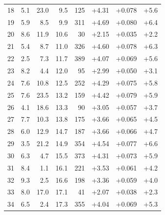 \begin{longtable}{@{}r r r r r r r r@{}}
18 & 5.1 & 23.0 & 9.5 & 125 & \cellcolor{green!55}+4.31 & \cellcolor{yellow!57}+0.078 & \cellcolor{orange!50}+5.6 \\
19 & 5.9 & 8.5 & 9.9 & 311 & \cellcolor{green!59}+4.69 & \cellcolor{yellow!58}+0.080 & \cellcolor{orange!55}+6.4 \\
20 & 8.6 & 11.9 & 10.6 & 30 & \cellcolor{green!33}+2.15 & \cellcolor{yellow!31}+0.035 & \cellcolor{orange!27}+2.2 \\
21 & 5.4 & 8.7 & 11.0 & 326 & \cellcolor{green!58}+4.60 & \cellcolor{yellow!57}+0.078 & \cellcolor{orange!55}+6.3 \\
22 & 2.5 & 7.3 & 11.7 & 389 & \cellcolor{green!53}+4.07 & \cellcolor{yellow!51}+0.069 & \cellcolor{orange!50}+5.6 \\
23 & 8.2 & 4.4 & 12.0 & 95 & \cellcolor{green!42}+2.99 & \cellcolor{yellow!40}+0.050 & \cellcolor{orange!33}+3.1 \\
24 & 7.6 & 10.8 & 12.5 & 252 & \cellcolor{green!55}+4.29 & \cellcolor{yellow!55}+0.075 & \cellcolor{orange!51}+5.8 \\
25 & 7.6 & 23.5 & 13.2 & 159 & \cellcolor{green!56}+4.42 & \cellcolor{yellow!57}+0.079 & \cellcolor{orange!52}+5.9 \\
26 & 4.1 & 18.6 & 13.3 & 90 & \cellcolor{green!42}+3.05 & \cellcolor{yellow!44}+0.057 & \cellcolor{orange!37}+3.7 \\
27 & 7.7 & 10.3 & 13.8 & 175 & \cellcolor{green!48}+3.66 & \cellcolor{yellow!49}+0.065 & \cellcolor{orange!42}+4.5 \\
28 & 6.0 & 12.9 & 14.7 & 187 & \cellcolor{green!49}+3.66 & \cellcolor{yellow!49}+0.066 & \cellcolor{orange!44}+4.7 \\
29 & 3.5 & 21.2 & 14.9 & 354 & \cellcolor{green!58}+4.54 & \cellcolor{yellow!56}+0.077 & \cellcolor{orange!57}+6.6 \\
30 & 6.3 & 4.7 & 15.5 & 373 & \cellcolor{green!55}+4.31 & \cellcolor{yellow!54}+0.073 & \cellcolor{orange!52}+5.9 \\
31 & 8.4 & 1.1 & 16.1 & 221 & \cellcolor{green!47}+3.53 & \cellcolor{yellow!47}+0.061 & \cellcolor{orange!41}+4.2 \\
32 & 9.3 & 2.5 & 16.6 & 198 & \cellcolor{green!45}+3.36 & \cellcolor{yellow!45}+0.059 & \cellcolor{orange!39}+4.0 \\
33 & 8.0 & 17.0 & 17.1 & 41 & \cellcolor{green!32}+2.07 & \cellcolor{yellow!33}+0.038 & \cellcolor{orange!28}+2.3 \\
34 & 6.5 & 2.4 & 17.3 & 355 & \cellcolor{green!52}+4.04 & \cellcolor{yellow!51}+0.069 & \cellcolor{orange!48}+5.3 \\

\end{longtable}
